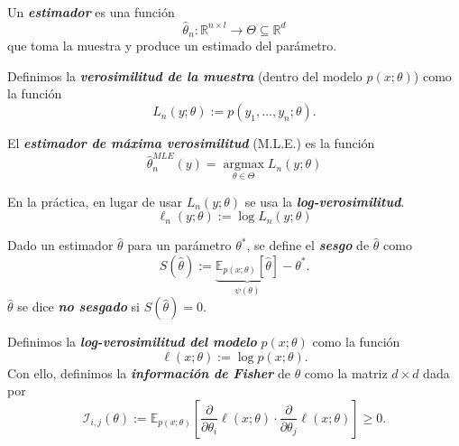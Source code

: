 \begin{definition}
Un \textit{\textbf{estimador}} es una funci\'on
\begin{equation*}
    \hat{\theta}_n\colon\mathbb{R}^{n\times l}\to\Theta\subseteq\mathbb{R}^d
\end{equation*}
que toma la muestra y produce un estimado del par\'ametro. 
\end{definition}

\begin{definition}
Definimos la \textit{\textbf{verosimilitud de la muestra}} (dentro del modelo $p(x;\theta)$) como la funci\'on
\begin{equation*}
    L_n(y;\theta):=p(y_1,\dots,y_n;\theta).
\end{equation*}
\end{definition}

\begin{definition}
El \textit{\textbf{estimador de m\'axima verosimilitud}} (M.L.E.) es la funci\'on 
\begin{equation*}
    \hat{\theta}_n^{MLE}(y)=\underset{\theta\in\Theta}{\text{arg}\max}L_n(y;\theta)
\end{equation*}
\end{definition}

\begin{observation}
En la pr\'actica, en lugar de usar $L_n(y;\theta)$ se usa la \textit{\textbf{log-verosimilitud}}.
\begin{equation*}
    \ell_n(y;\theta):=\log L_n(y;\theta)
\end{equation*}
\end{observation}

\begin{definition}
Dado un estimador $\hat{\theta}$ para un par\'ametro $\theta^*$, se define el \textit{\textbf{sesgo}} de $\hat{\theta}$ como
\begin{equation*}
    S(\hat{\theta}):=\underbrace{\mathbb{E}_{p(x;\theta)}[\hat{\theta}]}_{\psi(\theta)}-\theta^*.
\end{equation*}
$\hat{\theta}$ se dice \textit{\textbf{no sesgado}} si $S(\hat{\theta})=0$.
\end{definition}

\begin{definition}
Definimos la \textit{\textbf{log-verosimilitud del modelo}} $p(x;\theta)$ como la funci\'on
\begin{equation*}
    \ell(x;\theta):=\log p(x;\theta).
\end{equation*}
Con ello, definimos la \textit{\textbf{informaci\'on de Fisher}} de $\theta$ como la matriz $d\times d$ dada por
\begin{equation*}
    \mathcal{I}_{i,j}(\theta):=\mathbb{E}_{p(x;\theta)}\left[\frac{\partial}{\partial \theta_i}\ell(x;\theta)\cdot\frac{\partial}{\partial\theta_j}\ell(x;\theta)\right]\geq0.
\end{equation*}
\end{definition}

